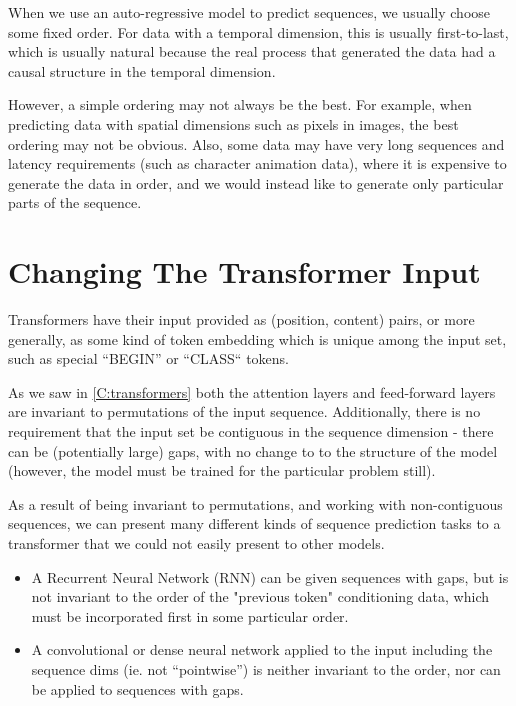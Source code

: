 When we use an auto-regressive model to predict sequences, we usually choose some fixed order. For data with a temporal dimension, this is usually first-to-last, which is usually natural because the real process that generated the data had a causal structure in the temporal dimension.

However, a simple ordering may not always be the best. For example, when predicting data with spatial dimensions such as pixels in images, the best ordering may not be obvious. Also, some data may have very long sequences and latency requirements (such as character animation data), where it is expensive to generate the data in order, and we would instead like to generate only particular parts of the sequence.

\section{Changing The Transformer Input}
\label{s:transformer-inputs}

Transformers have their input provided as (position, content) pairs, or more generally, as some kind of token embedding which is unique among the input set, such as special ``BEGIN'' or ``CLASS`` tokens.

As we saw in \cref{C:transformers} both the attention layers and feed-forward layers are invariant to permutations of the input sequence. Additionally, there is no requirement that the input set be contiguous in the sequence dimension - there can be (potentially large) gaps, with no change to to the structure of the model (however, the model must be trained for the particular problem still).

As a result of being invariant to permutations, and working with non-contiguous sequences, we can present many different kinds of sequence prediction tasks to a transformer that we could not easily present to other models.

\begin{itemize}
    \item A Recurrent Neural Network (RNN) can be given sequences with gaps, but is not invariant to the order of the "previous token" conditioning data, which must be incorporated first in some particular order.
    \item A convolutional or dense neural network applied to the input including the sequence dims (ie. not ``pointwise'') is neither invariant to the order, nor can be applied to sequences with gaps.
\end{itemize}

